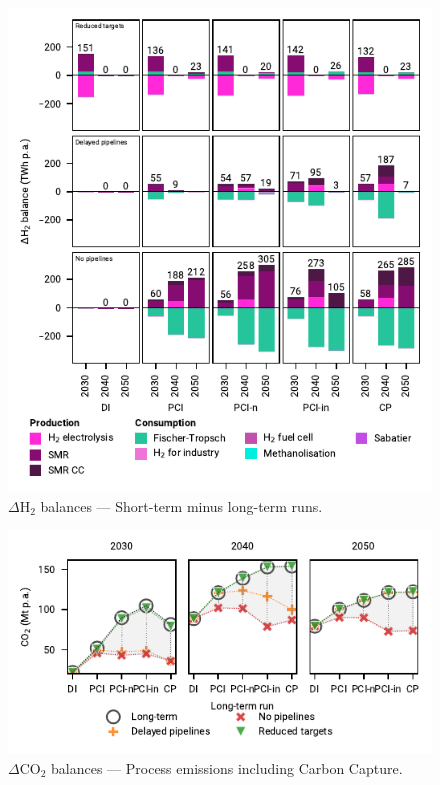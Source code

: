 \documentclass[pdflatex,sn-nature]{sn-jnl}%
\theoremstyle{thmstyleone}%
\theoremstyle{thmstyletwo}%
\theoremstyle{thmstylethree}%
\begin{document}
\begin{appendices}
\begin{figure}[htbp]
  \centering
  \includegraphics{figures/balances_overview_extended_H2}
  \caption{$\Delta$H$_2$ balances --- Short-term minus long-term runs.}
  \label{fig:balances_overview_extended_H2_stored}
\end{figure}

\begin{figure}[htbp]
  \centering
  \includegraphics{figures/delta_balances_process emissions CC}
  \caption{$\Delta$CO$_2$ balances --- Process emissions including Carbon Capture.}
  \label{fig:delta_balances_process_emissions_CC}
\end{figure}


\end{appendices}
\end{document}
